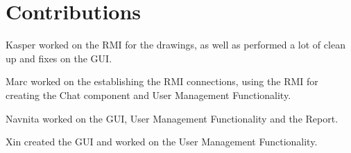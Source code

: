 \chapter{Contributions}
Kasper worked on the RMI for the drawings, as well as performed a lot of clean up and fixes on the GUI.

Marc worked on the establishing the RMI connections, using the RMI for creating the Chat component and User Management Functionality.

Navnita worked on the GUI, User Management Functionality and the Report.

Xin created the GUI and worked on the User Management Functionality.

